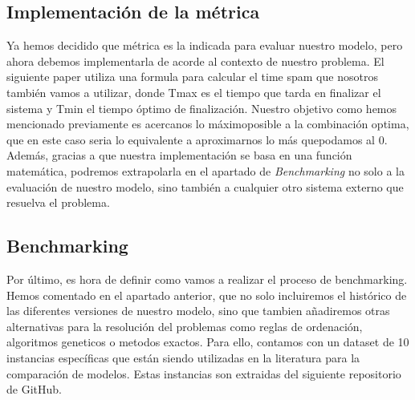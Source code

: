     \subsection{Implementación de la métrica} 
    Ya hemos decidido que métrica es la indicada para evaluar nuestro modelo, pero ahora debemos
    implementarla de acorde al contexto de nuestro problema. El siguiente paper utiliza una formula para
    calcular el time spam que nosotros también vamos a utilizar, donde Tmax es el tiempo que tarda en 
    finalizar el sistema y Tmin el tiempo óptimo de finalización. Nuestro objetivo como hemos mencionado 
    previamente es acercanos lo máximoposible a la combinación optima, que en este caso seria lo equivalente a 
    aproximarnos lo más quepodamos al 0. Además, gracias a que nuestra implementación se basa en una función 
    matemática, podremos extrapolarla en el apartado de \textit{Benchmarking} no solo a la evaluación de nuestro
    modelo, sino también a cualquier otro sistema externo que resuelva el problema. 
    
    
    \subsection{Benchmarking}
    Por último, es hora de definir como vamos a realizar el proceso de benchmarking. Hemos comentado en
    el apartado anterior, que no solo incluiremos el histórico de las diferentes versiones de nuestro
    modelo, sino que tambien añadiremos otras alternativas para la resolución del problemas como reglas de
    ordenación, algoritmos geneticos o metodos exactos. Para ello, contamos con un dataset de 10 instancias
    específicas que están siendo utilizadas en la literatura para la comparación de modelos. Estas instancias
    son extraidas del siguiente repositorio \cite*{ptal} de GitHub.

